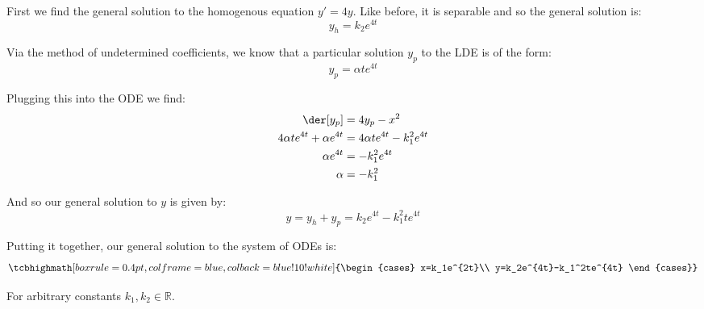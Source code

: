 \documentclass{article}
\begin{document}
First we find the general solution to the homogenous equation $y'=4y$. Like before, it is separable and so the general solution is:
\begin{equation*}
    y_h=k_2e^{4t}
\end{equation*}



Via the method of undetermined coefficients, we know that a particular solution $y_p$ to the LDE is of the form:
\begin{equation*}
    y_p=\alpha te^{4t}
\end{equation*}

Plugging this into the ODE we find:
\begin{align*}
    \der[y_p]&=4y_p-x^2\\
    4\alpha te^{4t}+\alpha e^{4t}&=4\alpha te^{4t}-k_1^2e^{4t}\\
    \alpha e^{4t}&=-k_1^2e^{4t}\\
    \alpha &=-k_1^2
\end{align*}

And so our general solution to $y$ is given by:
\begin{equation*}
    y=y_h+y_p=k_2e^{4t}-k_1^2te^{4t}
\end{equation*}

Putting it together, our general solution to the system of ODEs is:
\[\tcbhighmath[boxrule=0.4pt,colframe=blue,colback=blue!10!white]{\begin{cases}
    x=k_1e^{2t}\\
    y=k_2e^{4t}-k_1^2te^{4t}
\end{cases}}\]

For arbitrary constants $k_1,k_2\in\mathbb R$.
\end{document}
